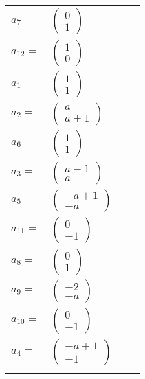 \documentclass[1p]{elsarticle_modified}
\theoremstyle{definition}
\begin{document}
\begin{tabular}{m{7pt} m{180pt} m{7pt} m{180pt} }
\flushright $a_{7}=$&$\begin{pmatrix}0\\1\end{pmatrix}$ \\
\flushright $a_{12}=$&$\begin{pmatrix}1\\0\end{pmatrix}$ \\
\flushright $a_{1}=$&$\begin{pmatrix}1\\1\end{pmatrix}$ \\
\flushright $a_{2}=$&$\begin{pmatrix}a\\a+1\end{pmatrix}$ \\
\flushright $a_{6}=$&$\begin{pmatrix}1\\1\end{pmatrix}$ \\
\flushright $a_{3}=$&$\begin{pmatrix}a-1\\a\end{pmatrix}$ \\
\flushright $a_{5}=$&$\begin{pmatrix}- a+1\\- a\end{pmatrix}$ \\
\flushright $a_{11}=$&$\begin{pmatrix}0\\-1\end{pmatrix}$ \\
\flushright $a_{8}=$&$\begin{pmatrix}0\\1\end{pmatrix}$ \\
\flushright $a_{9}=$&$\begin{pmatrix}-2\\- a\end{pmatrix}$ \\
\flushright $a_{10}=$&$\begin{pmatrix}0\\-1\end{pmatrix}$ \\
\flushright $a_{4}=$&$\begin{pmatrix}- a+1\\-1\end{pmatrix}$\\&\end{tabular}
\end{document}
